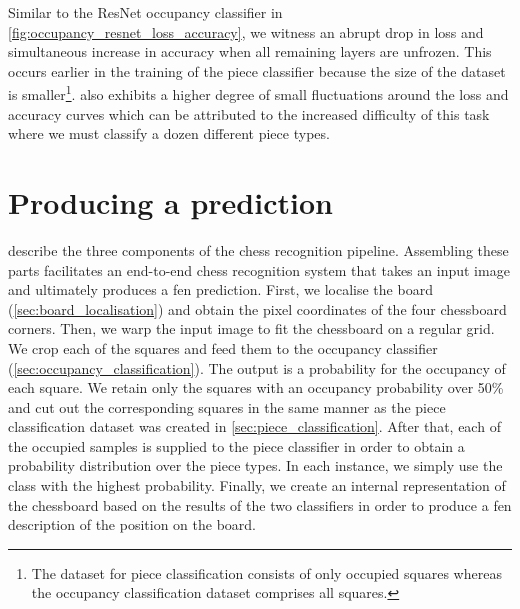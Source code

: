 \documentclass[../main.tex]{subfiles}
\begin{document}
Similar to the ResNet occupancy classifier in \cref{fig:occupancy_resnet_loss_accuracy}, we witness an abrupt drop in loss and simultaneous increase in accuracy when all remaining layers are unfrozen.
This occurs earlier in the training of the piece classifier because the size of the dataset is smaller\footnote{The dataset for piece classification consists of only occupied squares whereas the occupancy classification dataset comprises all squares.}.
 also exhibits a higher degree of small fluctuations around the loss and accuracy curves which can be attributed to the increased difficulty of this task where we must classify a dozen different piece types.

\section{Producing a prediction}
\label{sec:preparing_results}
 describe the three components of the chess recognition pipeline.
Assembling these parts facilitates an end-to-end chess recognition system that takes an input image and ultimately produces a \gls{fen} prediction.
First, we localise the board (\cref{sec:board_localisation}) and obtain the pixel coordinates of the four chessboard corners.
Then, we warp the input image to fit the chessboard on a regular grid.
We crop each of the squares and feed them to the occupancy classifier (\cref{sec:occupancy_classification}).
The output is a probability for the occupancy of each square.
We retain only the squares with an occupancy probability over 50\% and cut out the corresponding squares in the same manner as the piece classification dataset was created in \cref{sec:piece_classification}.
After that, each of the occupied samples is supplied to the piece classifier in order to obtain a probability distribution over the piece types.
In each instance, we simply use the class with the highest probability.
Finally, we create an internal representation of the chessboard based on the results of the two classifiers in order to produce a \gls{fen} description of the position on the board.
\end{document}

